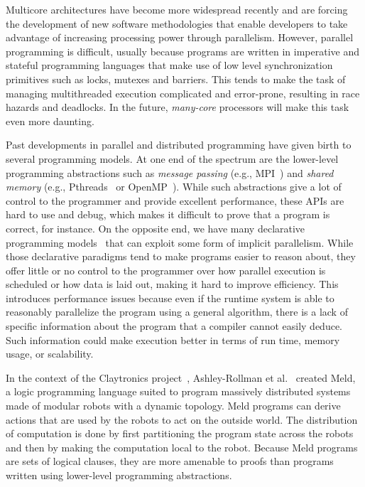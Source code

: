 Multicore architectures have become more widespread recently and are forcing the
development of new software methodologies that enable developers to take
advantage of increasing processing power through parallelism. However, parallel
programming is difficult, usually because programs are written in imperative and
stateful programming languages that make use of low level synchronization
primitives such as locks, mutexes and barriers. This tends to make the task of
managing multithreaded execution complicated and error-prone, resulting in race
hazards and deadlocks. In the future, \emph{many-core} processors will make this
task even more daunting.

Past developments in parallel and distributed programming have given birth to
several programming models. At one end of the spectrum are the lower-level
programming abstractions such as \emph{message passing} (e.g.,
MPI~\cite{gabriel04-open-mpi}) and \emph{shared memory} (e.g.,
Pthreads~\cite{Butenhof:1997:PPT:263953} or
OpenMP~\cite{Chapman-2007-UOP-1370966}). While such abstractions give a lot of
control to the programmer and provide excellent performance, these APIs are
hard to use and debug, which makes it difficult to prove that a program is
correct, for instance. On the opposite end, we have many declarative programming
models~\cite{Blelloch:1996:PPA:227234.227246} that can exploit some form of
implicit parallelism.  While those declarative paradigms tend to make programs
easier to reason about, they offer little or no control to the programmer over
how parallel execution is scheduled or how data is laid out, making it hard to
improve efficiency. This introduces performance issues because even if the
runtime system is able to reasonably parallelize the program using a general
algorithm, there is a lack of specific information about the program that a
compiler cannot easily deduce. Such information could make execution better in
terms of run time, memory usage, or scalability.

In the context of the Claytronics project~\cite{goldstein-computer05},
Ashley-Rollman et al.~\cite{ashley-rollman-iclp09,
ashley-rollman-derosa-iros07wksp} created Meld, a logic programming language
suited to program massively distributed systems made of modular robots with a
dynamic topology. Meld programs can derive actions that are used by the
robots to act on the outside world. The distribution of computation is done by
first partitioning the program state across the robots and then by making the
computation local to the robot. Because Meld programs are sets of logical
clauses, they are more amenable to proofs than programs written using
lower-level programming abstractions.

